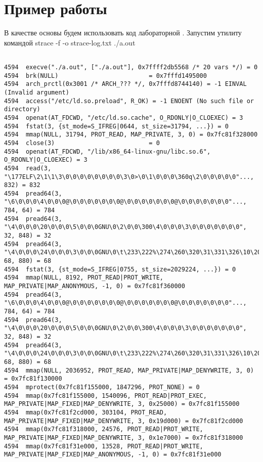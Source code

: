 \section{Пример работы}

В качестве основы будем использовать код лабораторной . Запустим утилиту \\ командой strace -f -o strace-log.txt ./a.out

\begin{verbatim}

4594  execve("./a.out", ["./a.out"], 0x7ffff2db5568 /* 20 vars */) = 0
4594  brk(NULL)                         = 0x7fffd1495000
4594  arch_prctl(0x3001 /* ARCH_??? */, 0x7fffd8744140) = -1 EINVAL (Invalid argument)
4594  access("/etc/ld.so.preload", R_OK) = -1 ENOENT (No such file or directory)
4594  openat(AT_FDCWD, "/etc/ld.so.cache", O_RDONLY|O_CLOEXEC) = 3
4594  fstat(3, {st_mode=S_IFREG|0644, st_size=31794, ...}) = 0
4594  mmap(NULL, 31794, PROT_READ, MAP_PRIVATE, 3, 0) = 0x7fc81f328000
4594  close(3)                          = 0
4594  openat(AT_FDCWD, "/lib/x86_64-linux-gnu/libc.so.6", O_RDONLY|O_CLOEXEC) = 3
4594  read(3, "\177ELF\2\1\1\3\0\0\0\0\0\0\0\0\3\0>\0\1\0\0\0\360q\2\0\0\0\0\0"..., 832) = 832
4594  pread64(3, "\6\0\0\0\4\0\0\0@\0\0\0\0\0\0\0@\0\0\0\0\0\0\0@\0\0\0\0\0\0\0"..., 784, 64) = 784
4594  pread64(3, "\4\0\0\0\20\0\0\0\5\0\0\0GNU\0\2\0\0\300\4\0\0\0\3\0\0\0\0\0\0\0", 32, 848) = 32
4594  pread64(3, "\4\0\0\0\24\0\0\0\3\0\0\0GNU\0\t\233\222%\274\260\320\31\331\326\10\204\276X>\263"..., 68, 880) = 68
4594  fstat(3, {st_mode=S_IFREG|0755, st_size=2029224, ...}) = 0
4594  mmap(NULL, 8192, PROT_READ|PROT_WRITE, MAP_PRIVATE|MAP_ANONYMOUS, -1, 0) = 0x7fc81f360000
4594  pread64(3, "\6\0\0\0\4\0\0\0@\0\0\0\0\0\0\0@\0\0\0\0\0\0\0@\0\0\0\0\0\0\0"..., 784, 64) = 784
4594  pread64(3, "\4\0\0\0\20\0\0\0\5\0\0\0GNU\0\2\0\0\300\4\0\0\0\3\0\0\0\0\0\0\0", 32, 848) = 32
4594  pread64(3, "\4\0\0\0\24\0\0\0\3\0\0\0GNU\0\t\233\222%\274\260\320\31\331\326\10\204\276X>\263"..., 68, 880) = 68
4594  mmap(NULL, 2036952, PROT_READ, MAP_PRIVATE|MAP_DENYWRITE, 3, 0) = 0x7fc81f130000
4594  mprotect(0x7fc81f155000, 1847296, PROT_NONE) = 0
4594  mmap(0x7fc81f155000, 1540096, PROT_READ|PROT_EXEC, MAP_PRIVATE|MAP_FIXED|MAP_DENYWRITE, 3, 0x25000) = 0x7fc81f155000
4594  mmap(0x7fc81f2cd000, 303104, PROT_READ, MAP_PRIVATE|MAP_FIXED|MAP_DENYWRITE, 3, 0x19d000) = 0x7fc81f2cd000
4594  mmap(0x7fc81f318000, 24576, PROT_READ|PROT_WRITE, MAP_PRIVATE|MAP_FIXED|MAP_DENYWRITE, 3, 0x1e7000) = 0x7fc81f318000
4594  mmap(0x7fc81f31e000, 13528, PROT_READ|PROT_WRITE, MAP_PRIVATE|MAP_FIXED|MAP_ANONYMOUS, -1, 0) = 0x7fc81f31e000

\end{verbatim}
